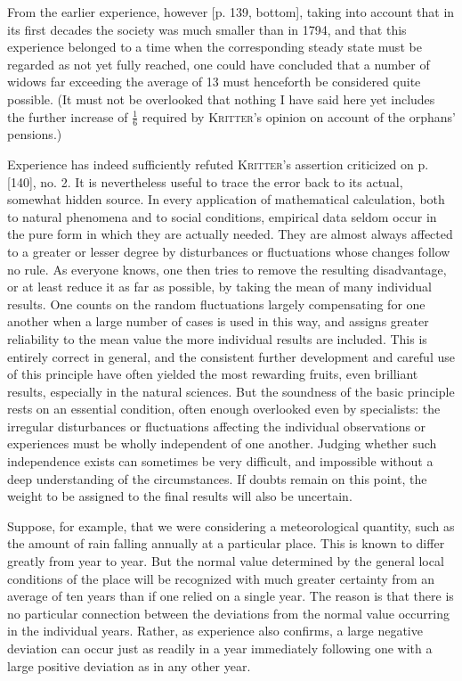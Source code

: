 \par{}\noindent
From the earlier experience, however [p. 139, bottom], taking into account that in its first decades the society was much smaller than in 1794, and that this experience belonged to a time when the corresponding steady state must be regarded as not yet fully reached, one could have concluded that a number of widows far exceeding the average of 13 must henceforth be considered quite possible. (It must not be overlooked that nothing I have said here yet includes the further increase of \(\tfrac16\) required by \textsc{Kritter}'s opinion on account of the orphans' pensions.)

Experience has indeed sufficiently refuted \textsc{Kritter}'s assertion criticized on p. [140], no. 2. It is nevertheless useful to trace the error back to its actual, somewhat hidden source. In every application of mathematical calculation, both to natural phenomena and to social conditions, empirical data seldom occur in the pure form in which they are actually needed. They are almost always affected to a greater or lesser degree by disturbances or fluctuations whose changes follow no rule. As everyone knows, one then tries to remove the resulting disadvantage, or at least reduce it as far as possible, by taking the mean of many individual results. One counts on the random fluctuations largely compensating for one another when a large number of cases is used in this way, and assigns greater reliability to the mean value the more individual results are included. This is entirely correct in general, and the consistent further development and careful use of this principle have often yielded the most rewarding fruits, even brilliant results, especially in the natural sciences. But the soundness of the basic principle rests on an essential condition, often enough overlooked even by specialists: the irregular disturbances or fluctuations affecting the individual observations or experiences must be wholly independent of one another. Judging whether such independence exists can sometimes be very difficult, and impossible without a deep understanding of the circumstances. If doubts remain on this point, the weight to be assigned to the final results will also be uncertain.

Suppose, for example, that we were considering a meteorological quantity, such as the amount of rain falling annually at a particular place. This is known to differ greatly from year to year. But the normal value determined by the general local conditions of the place will be recognized with much greater certainty from an average of ten years than if one relied on a single year. The reason is that there is no particular connection between the deviations from the normal value occurring in the individual years. Rather, as experience also confirms, a large negative deviation can occur just as readily in a year immediately following one with a large positive deviation as in any other year.

